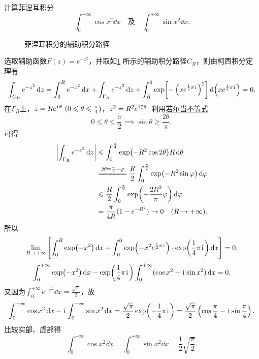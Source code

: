 \begin{example}
计算菲涅耳积分\[
\int_0^{+\infty} \cos x^2 \dd{x}
\quad\text{及}\quad
\int_0^{+\infty} \sin x^2 \dd{x}.
\]
\begin{solution}
\begin{figure}[ht]
\centering
{}
\caption{菲涅耳积分的辅助积分路径}
\label{figure:留数定理.菲涅耳积分的辅助积分路径}
\end{figure}

选取辅助函数\(F(z) = e^{-z^2}\)，并取如\cref{figure:留数定理.菲涅耳积分的辅助积分路径} 所示的辅助积分路径\(C_R\)，则由柯西积分定理有\[
\int_{C_R} e^{-z^2} \dd{z}
= \int_0^R e^{-x^2} \dd{x}
+ \int_{\Gamma_R} e^{-z^2} \dd{z}
+ \int_R^0 \exp[-\left(x e^{\frac{1}{4}\pi\kern1pt\mathrm{i}\kern1pt}\right)^2] \dd(x e^{\frac{1}{4}\pi\kern1pt\mathrm{i}\kern1pt})
= 0.
\]
在\(\Gamma_R\)上，\(z = R e^{\iu\theta}\ (0\leqslant\theta\leqslant\frac{\pi}{4})\)，\(z^2 = R^2 e^{\kern1pt\mathrm{i}\kern1pt2\theta}\).
利用\hyperref[equation:微分中值定理.若尔当不等式]{若尔当不等式}\[
0\leqslant\theta\leqslant\frac{\pi}{2}
\implies
\sin\theta\geqslant\frac{2\theta}{\pi},
\]可得\begin{align*}
\abs{\int_{\Gamma_R} e^{-z^2} \dd{z}}
&\leqslant
\int_0^{\frac{\pi}{4}} \exp(-R^2 \cos2\theta) R\dd{\theta} \\
&\xlongequal{2\theta=\frac{\pi}{2}-\varphi}
\frac{R}{2} \int_0^{\frac{\pi}{2}} \exp(-R^2 \sin\varphi) \dd{\varphi} \\
&\leqslant
\frac{R}{2} \int_0^{\frac{\pi}{2}} \exp(-\frac{2R^2}{\pi}\varphi) \dd{\varphi} \\
&= \frac{\pi}{4R} (1-e^{-R^2})
\to0\quad(R\to+\infty).
\end{align*}
所以\[
\lim\limits_{R\to+\infty} \left[
\int_0^R \exp(-x^2) \dd{x}
+ \int_R^0 \exp(-x^2 e^{\frac{1}{2}\pi\kern1pt\mathrm{i}\kern1pt}) \cdot \exp(\frac{1}{4}\pi\kern1pt\mathrm{i}\kern1pt) \dd{x}
\right] = 0,
\]\[
\int_0^{+\infty} \exp(-x^2) \dd{x} - \exp(\frac{1}{4}\pi\kern1pt\mathrm{i}\kern1pt) \int_0^{+\infty} (\cos x^2 - \kern1pt\mathrm{i}\kern1pt \sin x^2) \dd{x} = 0.
\]又因为\(\int_0^{+\infty} e^{-x^2} \dd{x} = \frac{\sqrt{\pi}}{2}\)，故\[
\int_0^{+\infty} \cos x^2 \dd{x}
- \kern1pt\mathrm{i}\kern1pt \int_0^{+\infty} \sin x^2 \dd{x}
= \frac{\sqrt{\pi}}{2} \exp(-\frac{1}{4}\pi\kern1pt\mathrm{i}\kern1pt)
= \frac{\sqrt{\pi}}{2} \left(\cos\frac{\pi}{4} - \kern1pt\mathrm{i}\kern1pt \sin\frac{\pi}{4}\right).
\]比较实部、虚部得\begin{equation}\label{equation:留数定理.菲涅耳积分}
\int_0^{+\infty} \cos x^2 \dd{x}
= \int_0^{+\infty} \sin x^2 \dd{x}
= \frac{1}{2} \sqrt{\frac{\pi}{2}}.
\end{equation}
\end{solution}
\end{example}

